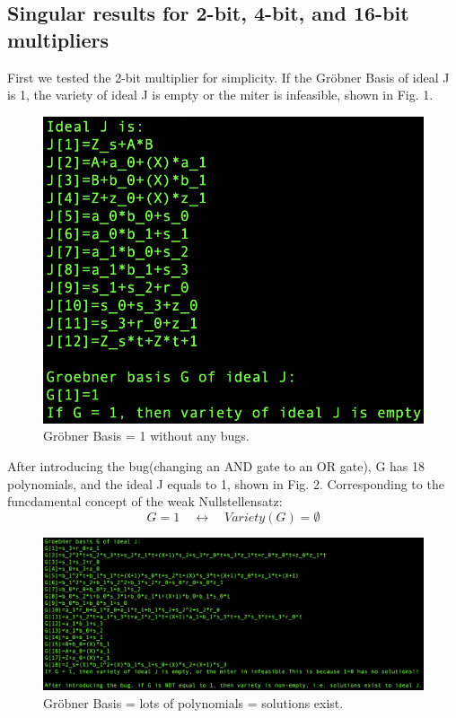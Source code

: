 \documentclass[conference]{IEEEtran}
\begin{document}
\subsection{Singular results for 2-bit, 4-bit, and 16-bit multipliers}
First we tested the 2-bit multiplier for simplicity. If the Gröbner Basis of ideal {J} is 1, the variety of ideal {J} 
is empty or the miter is infeasible, shown in Fig. 1. 
\begin{figure}[ht]
    \centering
    \includegraphics[scale = 0.5]{2-bit-GB1.png}
    \caption{Gröbner Basis = 1 without any bugs.}
\end{figure}
After introducing the bug(changing an AND gate to an OR gate), G has 18 polynomials, and the ideal {J} equals to 1, 
shown in Fig. 2. Corresponding to the funcdamental concept of the weak Nullstellensatz: 
\[ G = 1 \quad \longleftrightarrow \quad Variety(G) = \emptyset \]
\begin{figure}[ht]
    \centering
    \includegraphics[scale = 0.25]{2-bit-GB2.png}
    \caption{Gröbner Basis = lots of polynomials = solutions exist.}
\end{figure}
\end{document}
